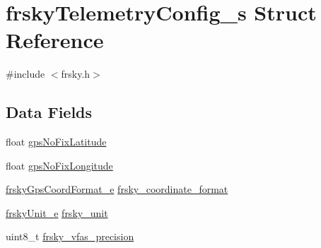 \hypertarget{structfrskyTelemetryConfig__s}{\section{frsky\+Telemetry\+Config\+\_\+s Struct Reference}
\label{structfrskyTelemetryConfig__s}
}


{\ttfamily \#include $<$frsky.\+h$>$}

\subsection*{Data Fields}
\begin{DoxyCompactItemize}
\item 
float \hyperlink{structfrskyTelemetryConfig__s_a5a2248605c5fc4e4e7244831ecf7a42d}{gps\+No\+Fix\+Latitude}
\item 
float \hyperlink{structfrskyTelemetryConfig__s_a81ca94cf69b47f0a2682b9f993f05adb}{gps\+No\+Fix\+Longitude}
\item 
\hyperlink{config_2frsky_8h_a7fd2f2298dc24a4139e918dc92bc8021}{frsky\+Gps\+Coord\+Format\+\_\+e} \hyperlink{structfrskyTelemetryConfig__s_a22a67f14fdc00ebadd71ee60d7816555}{frsky\+\_\+coordinate\+\_\+format}
\item 
\hyperlink{config_2frsky_8h_a42cf85b431b983dea7792d5ce4ba207c}{frsky\+Unit\+\_\+e} \hyperlink{structfrskyTelemetryConfig__s_a0d2215a90b90952fdd58f75f9f0d25ad}{frsky\+\_\+unit}
\item 
uint8\+\_\+t \hyperlink{structfrskyTelemetryConfig__s_a69703fffd42d2301354267acea09ece9}{frsky\+\_\+vfas\+\_\+precision}
\end{DoxyCompactItemize}


